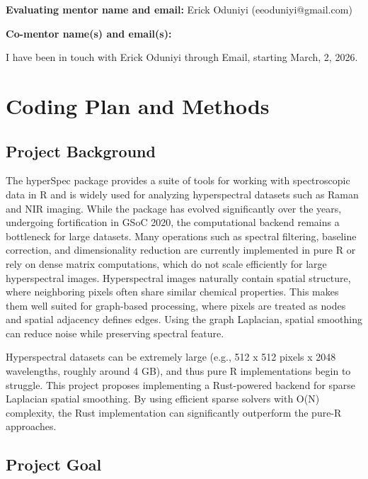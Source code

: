 \documentclass[11pt]{article}
\begin{document}
\textbf{Evaluating mentor name and email:} Erick Oduniyi
(eeoduniyi@gmail.com)

\textbf{Co-mentor name(s) and email(s):}

I have been in touch with Erick Oduniyi through Email, starting March,
2, 2026.

    \hypertarget{coding-plan-and-methods}{%
\section{Coding Plan and Methods}\label{coding-plan-and-methods}}

\hypertarget{project-background}{%
\subsection{Project Background}\label{project-background}}

The hyperSpec package provides a suite of tools for working with
spectroscopic data in R and is widely used for analyzing hyperspectral
datasets such as Raman and NIR imaging. While the package has evolved
significantly over the years, undergoing fortification in GSoC 2020, the
computational backend remains a bottleneck for large datasets. Many
operations such as spectral filtering, baseline correction, and
dimensionality reduction are currently implemented in pure R or rely on
dense matrix computations, which do not scale efficiently for large
hyperspectral images. Hyperspectral images naturally contain spatial
structure, where neighboring pixels often share similar chemical
properties. This makes them well suited for graph-based processing,
where pixels are treated as nodes and spatial adjacency defines edges.
Using the graph Laplacian, spatial smoothing can reduce noise while
preserving spectral feature.

Hyperspectral datasets can be extremely large (e.g., 512 x 512 pixels x
2048 wavelengths, roughly around 4 GB), and thus pure R implementations
begin to struggle. This project proposes implementing a Rust-powered
backend for sparse Laplacian spatial smoothing. By using efficient
sparse solvers with O(N) complexity, the Rust implementation can
significantly outperform the pure-R approaches.

\hypertarget{project-goal}{%
\subsection{Project Goal}\label{project-goal}}
\end{document}
